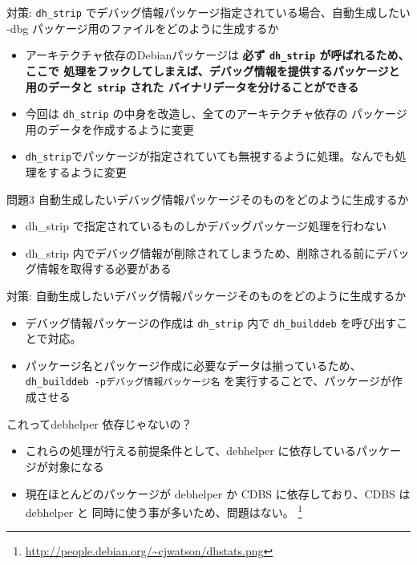 \begin{frame}{対策: \texttt{dh\_strip} でデバッグ情報パッケージ指定されている場合、自動生成したい -dbg パッケージ用のファイルをどのように生成するか}
\begin{itemize}[<+->]
\item アーキテクチャ依存のDebianパッケージは \bf{必ず} \texttt{dh\_strip} が呼ばれるため、ここで
処理をフックしてしまえば、デバッグ情報を提供するパッケージと用のデータと \texttt{strip} された
バイナリデータを分けることができる
\item 今回は \texttt{dh\_strip} の中身を改造し、全てのアーキテクチャ依存の
パッケージ用のデータを作成するように変更
\item \texttt{dh\_strip}でパッケージが指定されていても無視するように処理。なんでも処理をするように変更
\end{itemize}
\end{frame}

\begin{frame}{問題3}
自動生成したいデバッグ情報パッケージそのものをどのように生成するか
\pause
\begin{itemize}
\item dh\_strip で指定されているものしかデバッグパッケージ処理を行わない
\item dh\_strip 内でデバッグ情報が削除されてしまうため、削除される前にデバッグ情報を取得する必要がある
\end{itemize}

\end{frame}

\begin{frame}{対策: 自動生成したいデバッグ情報パッケージそのものをどのように生成するか}

\begin{itemize}
\item デバッグ情報パッケージの作成は \texttt{dh\_strip} 内で \texttt{dh\_builddeb} を呼び出すことで対応。
\item パッケージ名とパッケージ作成に必要なデータは揃っているため、
\texttt{dh\_builddeb -pデバッグ情報パッケージ名} を実行することで、パッケージが作成させる
\end{itemize}
\end{frame}

\begin{frame}{これってdebhelper 依存じゃないの？}
\pause
\begin{itemize}
\item これらの処理が行える前提条件として、debhelper に依存しているパッケージが対象になる
\item 現在ほとんどのパッケージが debhelper か CDBS に依存しており、CDBS は debhelper と
同時に使う事が多いため、問題はない。
\footnote{\url{http://people.debian.org/~cjwatson/dhstats.png}}
\end{itemize}
\end{frame}

